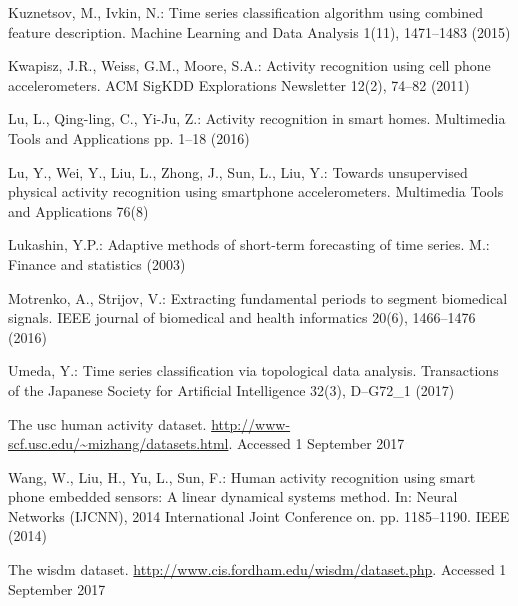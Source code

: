 \begin{thebibliography}{10}
	Kuznetsov, M., Ivkin, N.: Time series classification algorithm using combined
	feature description. Machine Learning and Data Analysis  1(11),  1471--1483
	(2015)
	
	Kwapisz, J.R., Weiss, G.M., Moore, S.A.: Activity recognition using cell phone
	accelerometers. ACM SigKDD Explorations Newsletter  12(2),  74--82 (2011)
	
	Lu, L., Qing-ling, C., Yi-Ju, Z.: Activity recognition in smart homes.
	Multimedia Tools and Applications pp. 1--18 (2016)
	
	Lu, Y., Wei, Y., Liu, L., Zhong, J., Sun, L., Liu, Y.: Towards unsupervised
	physical activity recognition using smartphone accelerometers. Multimedia
	Tools and Applications  76(8)
	
	Lukashin, Y.P.: Adaptive methods of short-term forecasting of time series. M.:
	Finance and statistics  (2003)
	
	Motrenko, A., Strijov, V.: Extracting fundamental periods to segment biomedical
	signals. IEEE journal of biomedical and health informatics  20(6),
	1466--1476 (2016)
	
	Umeda, Y.: Time series classification via topological data analysis.
	Transactions of the Japanese Society for Artificial Intelligence  32(3),
	D--G72\_1 (2017)
	
	The usc human activity dataset.
	\url{http://www-scf.usc.edu/~mizhang/datasets.html}. Accessed 1 September 2017
	
	Wang, W., Liu, H., Yu, L., Sun, F.: Human activity recognition using smart
	phone embedded sensors: A linear dynamical systems method. In: Neural
	Networks (IJCNN), 2014 International Joint Conference on. pp. 1185--1190.
	IEEE (2014)
	
	The wisdm dataset. \url{http://www.cis.fordham.edu/wisdm/dataset.php}. Accessed 1 September 2017
	
\end{thebibliography}





